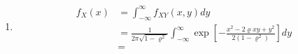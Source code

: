 \documentclass[11pt,a4paper]{article}
\begin{document}
\begin{enumerate}[label=\roman*)]
\item
\begin{align*}
f_X(x)&=\int_{-\infty}^\infty f_{XY}(x,y)dy\\
&=\frac{1}{2\pi\sqrt{1-\varrho^2}}\int_{-\infty}^\infty \exp\left[-\frac{x^2-2\varrho xy+y^2}{2(1-\varrho^2)}\right] dy\\
&=
\end{align*}
$$$$
\end{enumerate}
\end{document}
